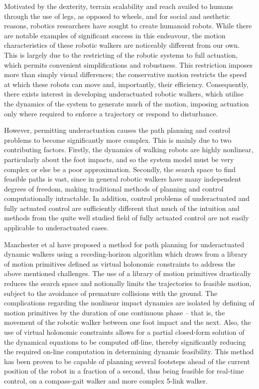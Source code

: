 Motivated by the dexterity, terrain scalability and reach availed to humans through the use of legs, as opposed to wheels, and for social and aesthetic reasons, robotics researchers have sought to create humanoid robots. While there are notable examples of significant success in this endeavour, the motion characteristics of these robotic walkers are noticeably different from our own. This is largely due to the restricting of the robotic systems to full actuation, which permits convenient simplifications and robustness. This restriction imposes more than simply visual differences; the conservative motion restricts the speed at which these robots can move and, importantly, their efficiency. Consequently, there exists interest in developing underactuated robotic walkers, which utilise the dynamics of the system to generate much of the motion, imposing actuation only where required to enforce a trajectory or respond to disturbance.

However, permitting underactuation causes the path planning and control problems to become significantly more complex. This is mainly due to two contributing factors. Firstly, the dynamics of walking robots are highly nonlinear, particularly about the foot impacts, and so the system model must be very complex or else be a poor approximation. Secondly, the search space to find feasible paths is vast, since in general robotic walkers have many independent degrees of freedom, making traditional methods of planning and control computationally intractable. In addition, control problems of underactuated and fully actuated control are sufficiently different that much of the intuition and methods from the quite well studied field of fully actuated control are not easily applicable to underactuated cases.

Manchester et al \cite{manchester13planning} have proposed a method for path planning for underactuated dynamic walkers using a receding-horizon algorithm which draws from a library of motion primitives defined as virtual holonomic constraints to address the above mentioned challenges. The use of a library of motion primitives drastically reduces the search space and notionally limits the trajectories to feasible motion, subject to the avoidance of premature collisions with the ground. The complications regarding the nonlinear impact dynamics are isolated by defining of motion primitives by the duration of one continuous phase – that is, the movement of the robotic walker between one foot impact and the next. Also, the use of virtual holonomic constraints allows for a partial closed-form solution of the dynamical equations to be computed off-line, thereby significantly reducing the required on-line computation in determining dynamic feasibility. This method has been proven to be capable of planning several footsteps ahead of the current position of the robot in a fraction of a second, thus being feasible for real-time control, on a compass-gait walker and more complex 5-link walker.

